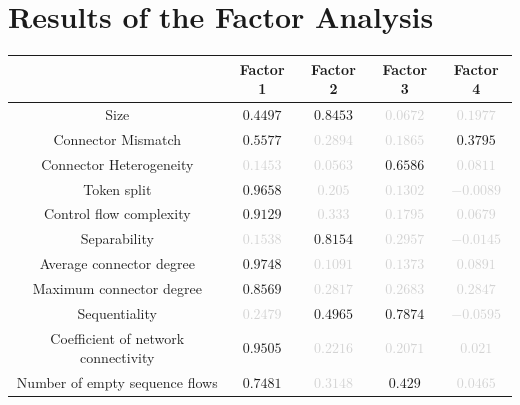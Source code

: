 \documentclass[a4paper]{article}
\begin{document}
\section*{Results of the Factor Analysis}
\begin{center}
\begin{tabular}{ccccc} \toprule 
 & Factor 1 & Factor 2 & Factor 3 & Factor 4 \\ \midrule 
Size & $0.4497$ & $0.8453$ & \textcolor{lightgray}{$0.0672$} & \textcolor{lightgray}{$0.1977$} \\ 
Connector Mismatch & $0.5577$ & \textcolor{lightgray}{$0.2894$} & \textcolor{lightgray}{$0.1865$} & $0.3795$ \\ 
Connector Heterogeneity & \textcolor{lightgray}{$0.1453$} & \textcolor{lightgray}{$0.0563$} & $0.6586$ & \textcolor{lightgray}{$0.0811$} \\ 
Token split & $0.9658$ & \textcolor{lightgray}{$0.205$} & \textcolor{lightgray}{$0.1302$} & \textcolor{lightgray}{$-0.0089$} \\ 
Control flow complexity & $0.9129$ & \textcolor{lightgray}{$0.333$} & \textcolor{lightgray}{$0.1795$} & \textcolor{lightgray}{$0.0679$} \\ 
Separability & \textcolor{lightgray}{$0.1538$} & $0.8154$ & \textcolor{lightgray}{$0.2957$} & \textcolor{lightgray}{$-0.0145$} \\ 
Average connector degree & $0.9748$ & \textcolor{lightgray}{$0.1091$} & \textcolor{lightgray}{$0.1373$} & \textcolor{lightgray}{$0.0891$} \\ 
Maximum connector degree & $0.8569$ & \textcolor{lightgray}{$0.2817$} & \textcolor{lightgray}{$0.2683$} & \textcolor{lightgray}{$0.2847$} \\ 
Sequentiality & \textcolor{lightgray}{$0.2479$} & $0.4965$ & $0.7874$ & \textcolor{lightgray}{$-0.0595$} \\ 
Coefficient of network connectivity & $0.9505$ & \textcolor{lightgray}{$0.2216$} & \textcolor{lightgray}{$0.2071$} & \textcolor{lightgray}{$0.021$} \\ 
Number of empty sequence flows & $0.7481$ & \textcolor{lightgray}{$0.3148$} & $0.429$ & \textcolor{lightgray}{$0.0465$} \\ 
\bottomrule
\end{tabular}
\end{center}
\end{document}
